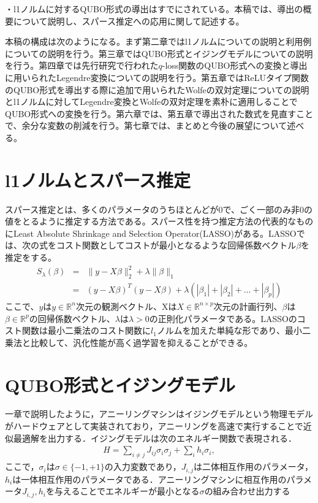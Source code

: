 \documentclass[paper]{ieicej}
\begin{document}
・l1ノルムに対するQUBO形式の導出はすでにされている。本稿では、導出の概要について説明し、スパース推定への応用に関して記述する。

本稿の構成は次のようになる。まず第二章ではl1ノルムについての説明と利用例についての説明を行う。第三章ではQUBO形式とイジングモデルについての説明を行う。第四章では先行研究で行われた$q$-loss関数のQUBO形式への変換と導出に用いられたLegendre変換についての説明を行う。第五章ではReLUタイプ関数のQUBO形式を導出する際に追加で用いられたWolfeの双対定理についての説明とl1ノルムに対してLegendre変換とWolfeの双対定理を素朴に適用しることでQUBO形式への変換を行う。第六章では、第五章で導出された数式を見直すことで、余分な変数の削減を行う。第七章では、まとめと今後の展望について述べる。


\section{l1ノルムとスパース推定}
スパース推定とは、多くのパラメータのうちほとんどが$0$で、ごく一部のみ非$0$の値をとるように推定する方法である。スパース性を持つ推定方法の代表的なものにLeast Absolute Shrinkage and Selection Operator(LASSO)がある。LASSOでは、次の式をコスト関数としてコストが最小となるような回帰係数ベクトル$\beta$を推定をする。
\begin{eqnarray}
 S_{\lambda}(\beta) &=& \|y-X\beta\|^{2}_{2} + \lambda\|\beta\|_{1} \nonumber \\
 &=& (y-X\beta )^{T}(y-X\beta )+\lambda(|\beta_{1}|+|\beta_{2}|+\dots +|\beta_{p}|) \label{lasso}
\end{eqnarray}
ここで、$y$は$y\in\mathbb{R}^{n}$次元の観測ベクトル、Xは$X\in\mathbb{R}^{n\times p}$次元の計画行列、$\beta$は$\beta\in\mathbb{R}^{p}$の回帰係数ベクトル、$\lambda$は$\lambda >0$の正則化パラメータである。LASSOのコスト関数は最小二乗法のコスト関数に$l_{1}$ノルムを加えた単純な形であり、最小二乗法と比較して、汎化性能が高く過学習を抑えることができる。

\section{QUBO形式とイジングモデル}
一章で説明したように，アニーリングマシンはイジングモデルという物理モデルがハードウェアとして実装されており，アニーリングを高速で実行することで近似最適解を出力する．イジングモデルは次のエネルギー関数で表現される．
\begin{eqnarray}
 H = \sum_{i\neq j}{J_{ij}\sigma_{i}\sigma_{j}}+\sum_{i}{h_{i}\sigma_{i}}, \label{Ising_model}
\end{eqnarray}
ここで，$\sigma_{i}$は$\sigma\in\{-1,+1\}$の入力変数であり，$J_{i,j}$は二体相互作用のパラメータ，$h_{i}$は一体相互作用のパラメータである．アニーリングマシンに相互作用のパラメータ$J_{i,j},h_{i}$を与えることでエネルギーが最小となる$\sigma$の組み合わせ出力する
\end{document}
